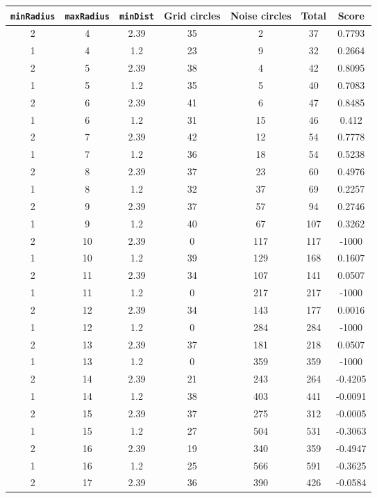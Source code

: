 \documentclass[letterpaper, 12pt]{article}
\begin{document}
\begin{longtable}{|c|c|c|c|c|c|c|}
\hline
\textbf{\texttt{minRadius}} & \textbf{\texttt{maxRadius}} & \textbf{\texttt{minDist}} & \textbf{Grid circles} & \textbf{Noise circles} & \textbf{Total} & \textbf{Score} \\
\hline
2 & 4 & 2.39 & 35 & 2 & 37 & 0.7793 \\
\hline
1 & 4 & 1.2 & 23 & 9 & 32 & 0.2664 \\
\hline
2 & 5 & 2.39 & 38 & 4 & 42 & 0.8095 \\
\hline
1 & 5 & 1.2 & 35 & 5 & 40 & 0.7083 \\
\hline
2 & 6 & 2.39 & 41 & 6 & 47 & 0.8485 \\
\hline
1 & 6 & 1.2 & 31 & 15 & 46 & 0.412 \\
\hline
2 & 7 & 2.39 & 42 & 12 & 54 & 0.7778 \\
\hline
1 & 7 & 1.2 & 36 & 18 & 54 & 0.5238 \\
\hline
2 & 8 & 2.39 & 37 & 23 & 60 & 0.4976 \\
\hline
1 & 8 & 1.2 & 32 & 37 & 69 & 0.2257 \\
\hline
2 & 9 & 2.39 & 37 & 57 & 94 & 0.2746 \\
\hline
1 & 9 & 1.2 & 40 & 67 & 107 & 0.3262 \\
\hline
2 & 10 & 2.39 & 0 & 117 & 117 & -1000 \\
\hline
1 & 10 & 1.2 & 39 & 129 & 168 & 0.1607 \\
\hline
2 & 11 & 2.39 & 34 & 107 & 141 & 0.0507 \\
\hline
1 & 11 & 1.2 & 0 & 217 & 217 & -1000 \\
\hline
2 & 12 & 2.39 & 34 & 143 & 177 & 0.0016 \\
\hline
1 & 12 & 1.2 & 0 & 284 & 284 & -1000 \\
\hline
2 & 13 & 2.39 & 37 & 181 & 218 & 0.0507 \\
\hline
1 & 13 & 1.2 & 0 & 359 & 359 & -1000 \\
\hline
2 & 14 & 2.39 & 21 & 243 & 264 & -0.4205 \\
\hline
1 & 14 & 1.2 & 38 & 403 & 441 & -0.0091 \\
\hline
2 & 15 & 2.39 & 37 & 275 & 312 & -0.0005 \\
\hline
1 & 15 & 1.2 & 27 & 504 & 531 & -0.3063 \\
\hline
2 & 16 & 2.39 & 19 & 340 & 359 & -0.4947 \\
\hline
1 & 16 & 1.2 & 25 & 566 & 591 & -0.3625 \\
\hline
2 & 17 & 2.39 & 36 & 390 & 426 & -0.0584 \\

\end{longtable}
\end{document}
